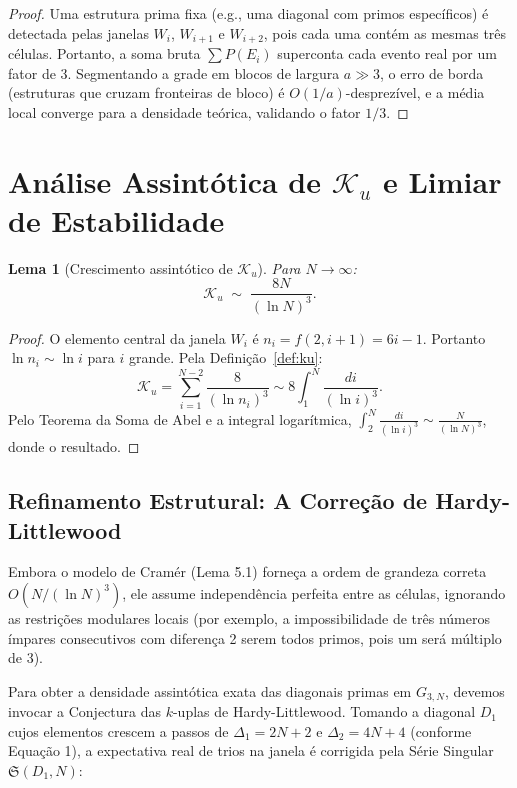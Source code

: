 \documentclass{article}
\newtheorem{lemma}[proposition]{Lema}
\begin{document}
	\begin{proof}
		Uma estrutura prima fixa (e.g., uma diagonal com primos específicos)
		é detectada pelas janelas $W_i$, $W_{i+1}$ e $W_{i+2}$, pois
		cada uma contém as mesmas três células. Portanto, a soma bruta
		$\sum P(E_i)$ superconta cada evento real por um fator de 3.
		Segmentando a grade em blocos de largura $a \gg 3$, o erro de
		borda (estruturas que cruzam fronteiras de bloco) é
		$O(1/a)$-desprezível, e a média local converge para a densidade
		teórica, validando o fator $1/3$.
	\end{proof}
	
	\section{Análise Assintótica de $\mathcal{K}_u$ e Limiar de Estabilidade}
	\label{sec:assintotica}
	
	\begin{lemma}[Crescimento assintótico de $\mathcal{K}_u$]
		\label{lem:ku}
		Para $N \to \infty$:
		\[
		\mathcal{K}_u \;\sim\; \frac{8N}{(\ln N)^3}.
		\]
	\end{lemma}
	
	\begin{proof}
		O elemento central da janela $W_i$ é $n_i = f(2, i+1) = 6i - 1$.
		Portanto $\ln n_i \sim \ln i$ para $i$ grande. Pela
		Definição~\ref{def:ku}:
		\[
		\mathcal{K}_u
		= \sum_{i=1}^{N-2} \frac{8}{(\ln n_i)^3}
		\sim 8\int_1^{N} \frac{di}{(\ln i)^3}.
		\]
		Pelo Teorema da Soma de Abel e a integral logarítmica,
		$\int_2^{N} \frac{di}{(\ln i)^3} \sim \frac{N}{(\ln N)^3}$,
		donde o resultado.
	\end{proof}
	
	\subsection{Refinamento Estrutural: A Correção de Hardy-Littlewood}
	Embora o modelo de Cramér (Lema 5.1) forneça a ordem de grandeza correta $O(N/(\ln N)^3)$, ele assume independência perfeita entre as células, ignorando as restrições modulares locais (por exemplo, a impossibilidade de três números ímpares consecutivos com diferença 2 serem todos primos, pois um será múltiplo de 3). 
	
	Para obter a densidade assintótica exata das diagonais primas em $G_{3,N}$, devemos invocar a Conjectura das $k$-uplas de Hardy-Littlewood. Tomando a diagonal $D_1$ cujos elementos crescem a passos de $\Delta_1 = 2N+2$ e $\Delta_2 = 4N+4$ (conforme Equação 1), a expectativa real de trios na janela é corrigida pela Série Singular $\mathfrak{S}(D_1, N)$:
	
\end{document}
